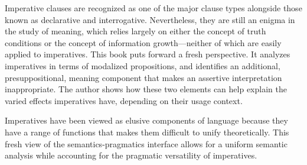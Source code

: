 Imperative clauses are recognized as one of the major clause types alongside those known as declarative and interrogative. Nevertheless, they are still an enigma in the study of meaning, which relies largely on either the concept of truth conditions or the concept of information growth—neither of which are easily applied to imperatives. This book puts forward a fresh perspective. It analyzes imperatives in terms of modalized propositions, and identifies an additional, presuppositional, meaning component that makes an assertive interpretation inappropriate. The author shows how these two elements can help explain the varied effects imperatives have, depending on their usage context.

Imperatives have been viewed as elusive components of language because they have a range of functions that makes them difficult to unify theoretically. This fresh view of the semantics-pragmatics interface allows for a uniform semantic analysis while accounting for the pragmatic versatility of imperatives.
\endinput